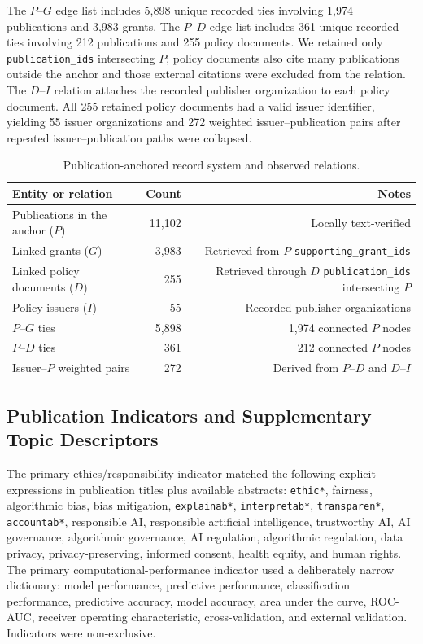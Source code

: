\documentclass[12pt]{article}
\begin{document}
The $P$--$G$ edge list includes 5,898 unique recorded ties involving 1,974 publications and 3,983 grants. The $P$--$D$ edge list includes 361 unique recorded ties involving 212 publications and 255 policy documents. We retained only \texttt{publication\_ids} intersecting $P$; policy documents also cite many publications outside the anchor and those external citations were excluded from the relation. The $D$--$I$ relation attaches the recorded publisher organization to each policy document. All 255 retained policy documents had a valid issuer identifier, yielding 55 issuer organizations and 272 weighted issuer--publication pairs after repeated issuer--publication paths were collapsed.

\begin{table}[H]
\centering
\caption{Publication-anchored record system and observed relations.}
\label{tab:record-system}
\begin{tabular}{lrr}
\toprule
Entity or relation & Count & Notes \\
\midrule
Publications in the anchor ($P$) & 11,102 & Locally text-verified \\
Linked grants ($G$) & 3,983 & Retrieved from $P$ \texttt{supporting\_grant\_ids} \\
Linked policy documents ($D$) & 255 & Retrieved through $D$ \texttt{publication\_ids} intersecting $P$ \\
Policy issuers ($I$) & 55 & Recorded publisher organizations \\
$P$--$G$ ties & 5,898 & 1,974 connected $P$ nodes \\
$P$--$D$ ties & 361 & 212 connected $P$ nodes \\
Issuer--$P$ weighted pairs & 272 & Derived from $P$--$D$ and $D$--$I$ \\
\bottomrule
\end{tabular}
\end{table}

\subsection{Publication Indicators and Supplementary Topic Descriptors}

The primary ethics/responsibility indicator matched the following explicit expressions in publication titles plus available abstracts: \texttt{ethic*}, fairness, algorithmic bias, bias mitigation, \texttt{explainab*}, \texttt{interpretab*}, \texttt{transparen*}, \texttt{accountab*}, responsible AI, responsible artificial intelligence, trustworthy AI, AI governance, algorithmic governance, AI regulation, algorithmic regulation, data privacy, privacy-preserving, informed consent, health equity, and human rights. The primary computational-performance indicator used a deliberately narrow dictionary: model performance, predictive performance, classification performance, predictive accuracy, model accuracy, area under the curve, ROC-AUC, receiver operating characteristic, cross-validation, and external validation. Indicators were non-exclusive.
\end{document}
